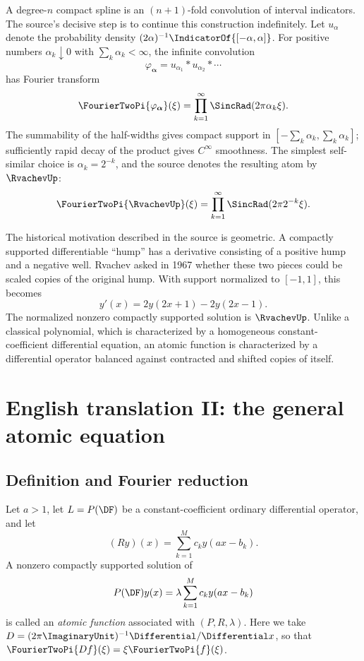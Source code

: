 \documentclass[11pt,oneside]{article}
\numberwithin{equation}{section}
\theoremstyle{definition}
\theoremstyle{remark}
\begin{document}
A degree-$n$ compact spline is an $(n+1)$-fold convolution of interval
indicators.  The source's decisive step is to continue this construction
indefinitely.  Let $u_{\alpha}$ denote the probability density
$(2\alpha)^{-1}\IndicatorOf{[-\alpha,\alpha]}$.  For positive numbers
$\alpha_k\downarrow0$ with $\sum_k\alpha_k<\infty$, the infinite convolution
\[
 \varphi_{\boldsymbol\alpha}
 =u_{\alpha_1}*u_{\alpha_2}*\cdots
\]
has Fourier transform
\begin{equation}\label{p6:eq:general-sinc-product}
 \FourierTwoPi{\varphi_{\boldsymbol\alpha}}(\xi)
 =\prod_{k=1}^{\infty}\SincRad(2\pi\alpha_k\xi).
\end{equation}
The summability of the half-widths gives compact support in
$[-\sum_k\alpha_k,\sum_k\alpha_k]$; sufficiently rapid decay of the product
gives $C^\infty$ smoothness.  The simplest self-similar choice is
$\alpha_k=2^{-k}$, and the source denotes the resulting atom by $\RvachevUp$:
\begin{equation}\label{p6:eq:up-fourier-product}
 \FourierTwoPi{\RvachevUp}(\xi)=\prod_{k=1}^{\infty}\SincRad(2\pi2^{-k}\xi).
\end{equation}

The historical motivation described in the source is geometric.  A compactly
supported differentiable ``hump'' has a derivative consisting of a positive
hump and a negative well.  Rvachev asked in 1967 whether these two pieces could
be scaled copies of the original hump.  With support normalized to $[-1,1]$,
this becomes
\begin{equation}\label{p6:eq:up-diffeq-intro}
 y'(x)=2y(2x+1)-2y(2x-1).
\end{equation}
The normalized nonzero compactly supported solution is $\RvachevUp$.  Unlike a
classical polynomial, which is characterized by a homogeneous constant-
coefficient differential equation, an atomic function is characterized by a
differential operator balanced against contracted and shifted copies of itself.

\section{English translation II: the general atomic equation}

\subsection{Definition and Fourier reduction}

\begin{definition}
Let $a>1$, let $L=P(\DF)$ be a constant-coefficient ordinary differential
operator, and let
\[
 (Ry)(x)=\sum_{k=1}^{M}c_k y(ax-b_k).
\]
A nonzero compactly supported solution of
\begin{equation}\label{p6:eq:atomic-general}
 P(\DF)y(x)=\lambda\sum_{k=1}^{M}c_k y(ax-b_k)
\end{equation}
is called an \emph{atomic function} associated with $(P,R,\lambda)$.
Here we take $D=(2\pi\ImaginaryUnit)^{-1}\Differential/\Differential x$, so that
$\FourierTwoPi{Df}(\xi)=\xi\FourierTwoPi{f}(\xi)$.
\end{definition}
\end{document}

